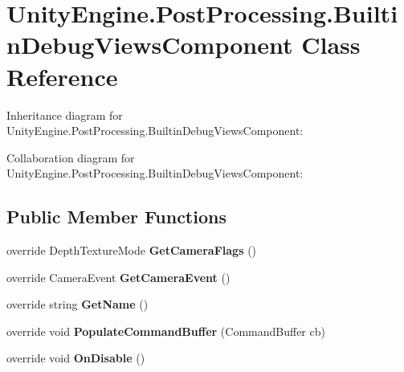\hypertarget{class_unity_engine_1_1_post_processing_1_1_builtin_debug_views_component}{}\section{Unity\+Engine.\+Post\+Processing.\+Builtin\+Debug\+Views\+Component Class Reference}
\label{class_unity_engine_1_1_post_processing_1_1_builtin_debug_views_component}


Inheritance diagram for Unity\+Engine.\+Post\+Processing.\+Builtin\+Debug\+Views\+Component\+:


Collaboration diagram for Unity\+Engine.\+Post\+Processing.\+Builtin\+Debug\+Views\+Component\+:
\subsection*{Public Member Functions}
\begin{DoxyCompactItemize}
\item 
\mbox{\label{class_unity_engine_1_1_post_processing_1_1_builtin_debug_views_component_ab4292e4509256eb32cb378060fa3250f}} 
override Depth\+Texture\+Mode {\bfseries Get\+Camera\+Flags} ()
\item 
\mbox{\label{class_unity_engine_1_1_post_processing_1_1_builtin_debug_views_component_a6f11761eaeb91f54400f5b9a3f5864b2}} 
override Camera\+Event {\bfseries Get\+Camera\+Event} ()
\item 
\mbox{\label{class_unity_engine_1_1_post_processing_1_1_builtin_debug_views_component_a18f07a927f8d2aee8f5e7bf045b87714}} 
override string {\bfseries Get\+Name} ()
\item 
\mbox{\label{class_unity_engine_1_1_post_processing_1_1_builtin_debug_views_component_a5eb24d5ee1ad5360967bfd5bc2c8485b}} 
override void {\bfseries Populate\+Command\+Buffer} (Command\+Buffer cb)
\item 
\mbox{\label{class_unity_engine_1_1_post_processing_1_1_builtin_debug_views_component_a67be7492ee423602f45ad4ce2896fae1}} 
override void {\bfseries On\+Disable} ()
\end{DoxyCompactItemize}
